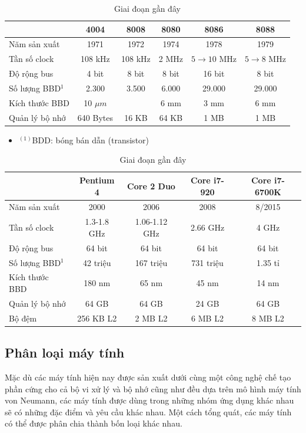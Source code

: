 \begin{table}[htb]
	\small
	\caption{Sự phát triển của các bộ xử lý Intel}
	\label{tab:Intel}
	\caption*{Giai đoạn những năm 1970}
		\begin{tabular}{l||c|c|c|c|c}
			\hline
			& \textbf{4004} & \textbf{8008} & \textbf{8080} & \textbf{8086} & \textbf{8088}\\
			\hline
			\hline
			Năm sản xuất & 1971 & 1972 & 1974 & 1978 & 1979 \\
			\hline
			Tần số clock & 108 kHz  & 108 kHz & 2 MHz & $5\to10$ MHz & $5\to8$ MHz \\
			\hline
			Độ rộng bus & 4 bit& 8 bit& 8 bit& 16 bit& 8 bit\\
			\hline
			Số lượng BBD$^{1}$ & 2.300 & 3.500 & 6.000 & 29.000 & 29.000 \\
			\hline
			Kích thước BBD & 10 ${\mu}m$ & & 6 mm & 3 mm & 6 mm\\
			\hline
			Quản lý bộ nhớ & 640 Bytes & 16 KB & 64 KB & 1 MB & 1 MB\\
			\hline
		\end{tabular}
		\begin{itemize} [] \footnotesize \itemsep1pt \parskip0pt 
        \item $^{(1)}$BDD: bóng bán dẫn (transistor)
		\end{itemize}
		\caption*{Giai đoạn gần đây}
				\begin{tabular}{l||c|c|c|c}
			\hline
			 & \textbf{Pentium 4} & \textbf{Core 2 Duo} & \textbf{Core i7-920} & \textbf{Core i7-6700K} \\
			\hline
				\hline
			Năm sản xuất & 2000 & 2006 & 2008 & 8/2015 \\
			\hline
			Tần số clock & 1.3-1.8 GHz  & 1.06-1.12 GHz & 2.66 GHz & 4 GHz  \\
			\hline
			Độ rộng bus & 64 bit & 64 bit & 64 bit & 64 bit\\
			\hline
			Số lượng BBD$^{1}$ & 42 triệu & 167 triệu & 731 triệu & 1.35 tỉ  \\
			\hline
			Kích thước BBD & 180 nm & 65 nm & 45 nm & 14 nm \\
			\hline
			Quản lý bộ nhớ & 64 GB & 64 GB & 24 GB & 64 GB \\
			\hline
			Bộ đệm & 256 KB L2 & 2 MB L2 & 6 MB L2 & 8 MB L2 \\ 
			\hline
		\end{tabular}
\end{table}

\subsection{Phân loại máy tính}
Mặc dù các máy tính hiện nay được sản xuất dưới cùng một công nghệ chế tạo phần cứng cho cả bộ vi xử lý và bộ nhớ cũng như đều dựa trên mô hình máy tính von Neumann, các máy tính được dùng trong những nhóm ứng dụng khác nhau sẽ có những đặc điểm và yêu cầu khác nhau. Một cách tổng quát, các máy tính có thể được phân chia thành bốn loại khác nhau.

